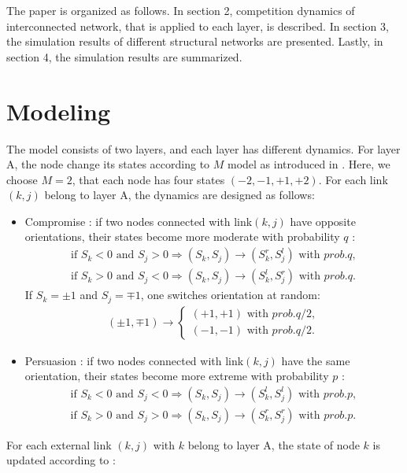 \documentclass[english]{cccconf}
\begin{document}
The paper is organized as follows. In section 2, competition dynamics of interconnected network, that is applied to each layer, is described. In section 3, the simulation results of different structural networks are presented. Lastly, in section 4, the simulation results are summarized.

\section{Modeling}
The model consists of two layers, and each layer has different dynamics. For layer A, the node change its states according to $M$ model as introduced in \cite{rocca2014}. Here, we choose $M=2$, that each node has four states $(-2, -1, +1, +2)$. For each link $(k, j)$ belong to layer A,  the dynamics are designed as follows:
\begin{itemize}
\item Compromise : if two nodes connected with link$(k, j)$ have opposite orientations, their states become more moderate with probability $q$ :
\begin{align*}
\mbox{if } S_k<0 \mbox{ and } S_j>0  \Rightarrow (S_k, S_j) \rightarrow (S_k^r, S_j^l) \mbox{ with } prob.q,\\
\mbox{if } S_k>0 \mbox{ and } S_j<0  \Rightarrow (S_k, S_j) \rightarrow (S_k^l, S_j^r) \mbox{ with } prob.q.
\end{align*}
If $S_k = \pm1$ and $S_j = \mp1$, one switches orientation at random:
\begin{align*}
(\pm 1, \mp 1)\rightarrow \left\{\begin{matrix}
(+1, +1) \mbox{ with } prob.q/2,
\\(-1, -1)\mbox{ with } prob.q/2.
\end{matrix}\right.
\end{align*}
\item Persuasion : if two nodes connected with link$(k, j)$ have the same orientation, their states become more extreme with probability $p$ :
\begin{align*}
\mbox{if } S_k<0 \mbox{ and } S_j<0  \Rightarrow (S_k, S_j) \rightarrow (S_k^l, S_j^l) \mbox{ with } prob.p,\\
\mbox{if } S_k>0 \mbox{ and } S_j>0  \Rightarrow (S_k, S_j) \rightarrow (S_k^r, S_j^r) \mbox{ with } prob.p.
\end{align*}
\end{itemize}
For each external link $(k,j)$ with $k$ belong to layer A, the state of node $k$ is updated according to :
\end{document}
